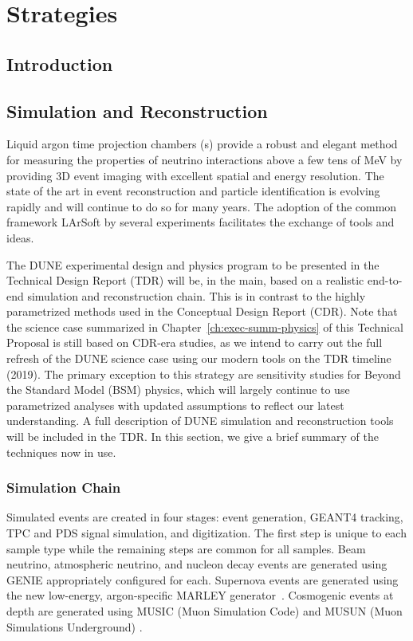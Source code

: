 \chapter{Strategies}
\label{ch:exec-summ-strat}

\section{Introduction}
\label{sec:exec-summ-strat-intro}

\section{Simulation and Reconstruction}
\label{sec:exec-summ-strat-simreco}

Liquid argon time projection chambers (\lartpc{}s) provide a robust and elegant method for measuring the properties of neutrino interactions above a few tens of MeV by providing 3D event imaging with excellent spatial and energy resolution.  The state of the art in \lartpc event reconstruction and particle identification is evolving rapidly and will continue to do so for many years.  The adoption of the common framework LArSoft by several \lartpc experiments facilitates the exchange of tools and ideas.

The DUNE experimental design and physics program to be presented in the Technical Design Report (TDR) will be, in the main, based on a realistic end-to-end simulation and reconstruction chain.  This is in contrast to the highly parametrized methods used in the Conceptual Design Report (CDR).  Note that the science case summarized in Chapter~\ref{ch:exec-summ-physics} of this Technical Proposal is still based on CDR-era studies, as we intend to carry out the full refresh of the DUNE science case using our modern tools on the TDR timeline (2019).  The primary exception to this strategy are sensitivity studies for Beyond the Standard Model (BSM) physics, which will largely continue to use parametrized analyses with updated assumptions to reflect our latest understanding.  A full description of DUNE simulation and reconstruction tools will be included in the TDR.  In this section, we give a brief summary of the techniques now in use.

\subsection{Simulation Chain}
Simulated events are created in four stages: event generation, {\sc GEANT4} tracking, TPC and PDS signal simulation, and digitization.  The first step is unique to each sample type while the remaining steps are common for all samples. Beam neutrino, atmospheric neutrino, and nucleon decay events are generated using {\sc GENIE} appropriately configured for each.  Supernova events are generated using the new low-energy, argon-specific MARLEY generator~\cite{marley}.  Cosmogenic events at depth are generated using MUSIC (Muon Simulation Code) \cite{MUSICPaper} and MUSUN (Muon Simulations Underground) \cite{Kudryavtsev:musun}.


